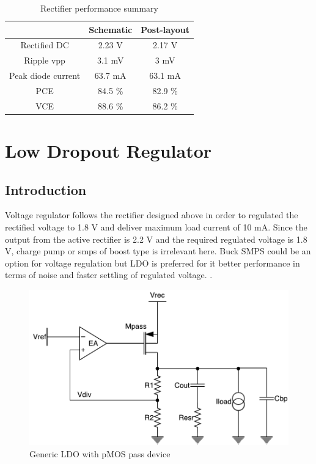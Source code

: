 \documentclass[UKenglish]{ifimaster}  %
\begin{document}
\begin{table}[H]
\caption{Rectifier performance summary}
\begin{center}
\begin{tabular}{c|c|c}
\hline \hline
				 & \textbf{Schematic}		& \textbf{Post-layout} \\
\hline \hline
Rectified DC	 	& 2.23 V 				& 2.17 V	\\ \hline
Ripple \acrshort{vpp} & 3.1 mV 				& 3 mV	\\ \hline
Peak diode current 	& 63.7 mA 			&	63.1 mA	\\ \hline
PCE 				& 84.5 \% 				&	82.9 \%	\\ \hline
VCE 				& 88.6 \% 				&	86.2 \%	\\
\hline \hline
\end{tabular}
\end{center}
\label{tab:rect_spec}
\end{table}


\chapter{Low Dropout Regulator}

\section{Introduction}		%

Voltage regulator follows the rectifier designed above in order to regulated the rectified voltage to 1.8 V and 
deliver maximum load current of 10 mA. Since the output from the active rectifier is 2.2 V and the required 
regulated voltage is 1.8 V, charge pump or  \acrshort{smps} of boost type is irrelevant here. Buck SMPS could be 
an option for voltage regulation but LDO is preferred for it better performance in terms of noise and faster 
settling of regulated voltage.  \cite{ldo_psu}.\\ 

\begin{figure}[htbp] %
   \centering
   \includegraphics[width=\textwidth]{img/ldo.pdf} 
   \caption{Generic LDO with pMOS pass device}
   \label{ldo_gen}
\end{figure}
\end{document}
